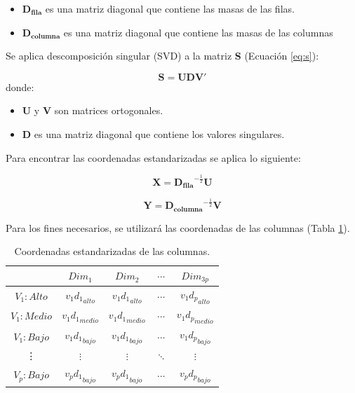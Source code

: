 \documentclass[water,article,submit,moreauthors,pdftex]{mdpi}
\providecommand{\tightlist}{%
  \setlength{\itemsep}{0pt}\setlength{\parskip}{4pt}}
\begin{document}
\begin{itemize}
\tightlist
\item
  \(\mathbf{D_{fila}}\) es una matriz diagonal que contiene las masas de
  las filas.\\
\item
  \(\mathbf{D_{columna}}\) es una matriz diagonal que contiene las masas
  de las columnas
\end{itemize}

Se aplica descomposición singular (SVD) a la matriz \textbf{S} (Ecuación
\ref{eq:s}):

\begin{equation}
\mathbf{S}=\mathbf{U}\mathbf{D}\mathbf{V'}
\label{eq:svd}
\end{equation} donde:

\begin{itemize}
\tightlist
\item
  \(\mathbf{U}\) y \(\mathbf{V}\) son matrices ortogonales.\\
\item
  \(\mathbf{D}\) es una matriz diagonal que contiene los valores
  singulares.
\end{itemize}

Para encontrar las coordenadas estandarizadas se aplica lo siguiente:

\begin{equation}
\mathbf{X}=\mathbf{D_{fila}}^{-\frac{1}{2}} \mathbf{U}
\label{eq:xcoor}
\end{equation}

\begin{equation}
\mathbf{Y}=\mathbf{D_{columna}}^{-\frac{1}{2}} \mathbf{V}
\label{eq:ycoor}
\end{equation}

Para los fines necesarios, se utilizará las coordenadas de las columnas
(Tabla \ref{tab:colcoor}).

\begin{table}[!ht]
\begin{center}
 \begin{tabular}{|| c ||c c c c||} 
 \hline
 & $Dim_{1}$      & $Dim_{2}$ & $\cdots$ & $Dim_{3p}$ \\ [0.5ex] 
 \hline\hline
  $V_{1}:Alto$    & ${v_{1}d_{1}}_{alto}$& ${v_{1}d_{1}}_{alto}$  & $\cdots$ & ${v_{1}d_{p}}_{alto}$\\
 \hline
 $V_{1}:Medio$    &${v_{1}d_{1}}_{medio}$ & ${v_{1}d_{1}}_{medio}$ & $\cdots$ & ${v_{1}d_{p}}_{medio}$\\
\hline
 $V_{1}:Bajo$     &${v_{1}d_{1}}_{bajo}$ & ${v_{1}d_{1}}_{bajo}$  &$\cdots$ & ${v_{1}d_{p}}_{bajo}$\\
\hline
\vdots & $\vdots$ & $\vdots$  &$\ddots$& $\vdots$\\
\hline
 $V_{p}:Bajo$     &${v_{p}d_{1}}_{bajo}$ & ${v_{p}d_{1}}_{bajo}$ & $\cdots$ & ${v_{p} d_{p}} _{bajo}$ \\ [1ex] 
 \hline
\end{tabular}\caption{Coordenadas estandarizadas de las columnas.}
\label{tab:colcoor}
\end{center}
\end{table}
\end{document}
